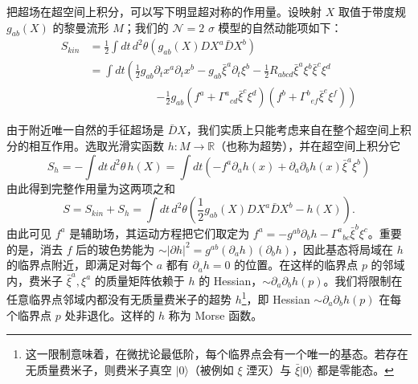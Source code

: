 把超场在超空间上积分，可以写下明显超对称的作用量。设映射 $X$ 取值于带度规 $g_{ab}(X)$ 的黎曼流形 $M$；我们的 $\mathcal{N}=2$ $\sigma$ 模型的自然动能项如下：
\begin{equation}\tag{B.9}
\begin{aligned}
S_{kin} &= \frac{1}{2}\int dt\,d^2\theta\left( g_{ab}(X)DX^a\bar DX^b \right)\\
&= \int dt\left( \frac{1}{2}g_{ab}\partial_t x^a\partial_t x^b - g_{ab}\bar\xi^a\partial_t\xi^b - \frac{1}{2}R_{abcd}\bar\xi^a\xi^b\bar\xi^c\xi^d \right.\\
&\qquad\qquad\qquad \left. - \frac{1}{2}g_{ab}\left( f^a+\Gamma^a{}_{cd}\bar\xi^c\xi^d \right)\left( f^b+\Gamma^b{}_{ef}\bar\xi^e\xi^f \right) \right)
\end{aligned}
\end{equation}

由于附近唯一自然的手征超场是 $\bar DX$，我们实质上只能考虑来自在整个超空间上积分的相互作用。选取光滑实函数 $h:M\to\mathbb{R}$（也称为超势），并在超空间上积分它
\begin{equation}\tag{B.10}
S_h = -\int dt\,d^2\theta\, h(X) = \int dt\left( -f^a\partial_a h(x) + \partial_a\partial_b h(x)\bar\xi^a\xi^b \right)
\end{equation}
由此得到完整作用量为这两项之和
\begin{equation}\tag{B.11}
S = S_{kin} + S_h = \int dt\,d^2\theta\left( \frac{1}{2}g_{ab}(X)DX^a\bar DX^b - h(X) \right).
\end{equation}
由此可见 $f^a$ 是辅助场，其运动方程把它们取定为 $f^a=-g^{ab}\partial_b h-\Gamma^a{}_{bc}\bar\xi^b\xi^c$。重要的是，消去 $f$ 后的玻色势能为 $\sim|\partial h|^2=g^{ab}(\partial_a h)(\partial_b h)$，因此基态将局域在 $h$ 的临界点附近，即满足对每个 $a$ 都有 $\partial_a h=0$ 的位置。在这样的临界点 $p$ 的邻域内，费米子 $\bar\xi^a,\xi^a$ 的质量矩阵依赖于 $h$ 的 Hessian，$\sim\partial_a\partial_b h(p)$。我们将限制在任意临界点邻域内都没有无质量费米子的超势 $h$\footnote{这一限制意味着，在微扰论最低阶，每个临界点会有一个唯一的基态。若存在无质量费米子，则费米子真空 $|0\rangle$（被例如 $\xi$ 湮灭）与 $\bar\xi|0\rangle$ 都是零能态。}，即 Hessian $\sim\partial_a\partial_b h(p)$ 在每个临界点 $p$ 处非退化。这样的 $h$ 称为 Morse 函数。


